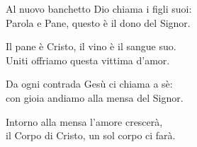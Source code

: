 

\spazio

\strofa Al nuovo banchetto Dio chiama i figli suoi:\\
Parola e Pane, questo è il dono del Signor.

\spazio


\spazio

\strofa Il pane è Cristo, il vino è il sangue suo.\\
Uniti offriamo questa vittima d'amor.

\spazio


\spazio

\strofa Da ogni contrada Gesù ci chiama a sè:\\
con gioia andiamo alla mensa del Signor.

\spazio


\spazio

\strofa Intorno alla mensa l'amore crescerà,\\
il Corpo di Cristo, un sol corpo ci farà.

\spazio

